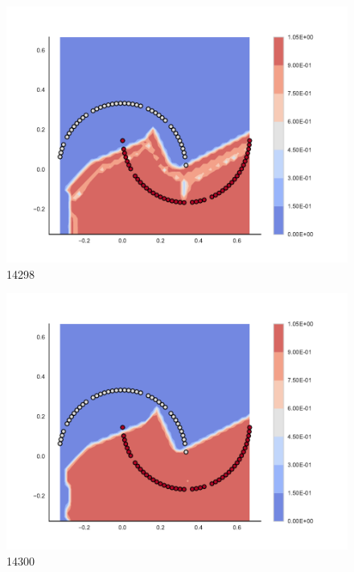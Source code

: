 \begin{subfigure}[b]{0.09\textwidth}
    \includegraphics[clip, trim=2.35cm 1.75cm 4.5cm 0cm,width=\textwidth]{img/convergence/14298.pdf}
    \caption{14298}
    \label{fig:convergence_14298}
\end{subfigure}
%
\begin{subfigure}[b]{0.09\textwidth}
    \includegraphics[clip, trim=2.35cm 1.75cm 4.5cm 0cm,width=\textwidth]{img/convergence/14300.pdf}
    \caption{14300}
    \label{fig:convergence_14300}
\end{subfigure}
%
